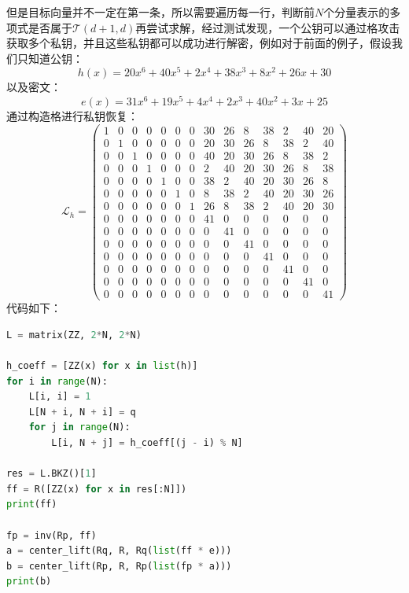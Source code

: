 \documentclass{book}
\numberwithin{equation}{subsubsection}
\begin{document}
但是目标向量并不一定在第一条，所以需要遍历每一行，判断前$N$个分量表示的多项式是否属于$\mathcal{T}(d+1, d)$再尝试求解，经过测试发现，一个公钥可以通过格攻击获取多个私钥，并且这些私钥都可以成功进行解密，例如对于前面的例子，假设我们只知道公钥：
\begin{equation}
    h(x)=20 x^{6} + 40 x^{5} + 2 x^{4} + 38 x^{3} + 8 x^{2} + 26 x + 30
    \nonumber
\end{equation}
以及密文：
\begin{equation}
    e(x)=31 x^{6} + 19 x^{5} + 4 x^{4} + 2 x^{3} + 40 x^{2} + 3 x + 25
    \nonumber
\end{equation}
通过构造格进行私钥恢复：
\begin{equation}
    \mathcal{L}_h=\left(\begin{array}{rrrrrrrrrrrrrr} 1 & 0 & 0 & 0 & 0 & 0 & 0 & 30 & 26 & 8 & 38 & 2 & 40 & 20 \\ 0 & 1 & 0 & 0 & 0 & 0 & 0 & 20 & 30 & 26 & 8 & 38 & 2 & 40 \\ 0 & 0 & 1 & 0 & 0 & 0 & 0 & 40 & 20 & 30 & 26 & 8 & 38 & 2 \\ 0 & 0 & 0 & 1 & 0 & 0 & 0 & 2 & 40 & 20 & 30 & 26 & 8 & 38 \\ 0 & 0 & 0 & 0 & 1 & 0 & 0 & 38 & 2 & 40 & 20 & 30 & 26 & 8 \\ 0 & 0 & 0 & 0 & 0 & 1 & 0 & 8 & 38 & 2 & 40 & 20 & 30 & 26 \\ 0 & 0 & 0 & 0 & 0 & 0 & 1 & 26 & 8 & 38 & 2 & 40 & 20 & 30 \\ 0 & 0 & 0 & 0 & 0 & 0 & 0 & 41 & 0 & 0 & 0 & 0 & 0 & 0 \\ 0 & 0 & 0 & 0 & 0 & 0 & 0 & 0 & 41 & 0 & 0 & 0 & 0 & 0 \\ 0 & 0 & 0 & 0 & 0 & 0 & 0 & 0 & 0 & 41 & 0 & 0 & 0 & 0 \\ 0 & 0 & 0 & 0 & 0 & 0 & 0 & 0 & 0 & 0 & 41 & 0 & 0 & 0 \\ 0 & 0 & 0 & 0 & 0 & 0 & 0 & 0 & 0 & 0 & 0 & 41 & 0 & 0 \\ 0 & 0 & 0 & 0 & 0 & 0 & 0 & 0 & 0 & 0 & 0 & 0 & 41 & 0 \\ 0 & 0 & 0 & 0 & 0 & 0 & 0 & 0 & 0 & 0 & 0 & 0 & 0 & 41 \end{array}\right)
    \nonumber
\end{equation}
代码如下：
\begin{lstlisting}[language=Python,basicstyle=\ttfamily,breaklines=true,keywordstyle=\bfseries\color{blue}]
L = matrix(ZZ, 2*N, 2*N)

h_coeff = [ZZ(x) for x in list(h)]
for i in range(N):
    L[i, i] = 1
    L[N + i, N + i] = q
    for j in range(N):
        L[i, N + j] = h_coeff[(j - i) % N]

res = L.BKZ()[1]
ff = R([ZZ(x) for x in res[:N]])
print(ff)

fp = inv(Rp, ff)
a = center_lift(Rq, R, Rq(list(ff * e)))
b = center_lift(Rp, R, Rp(list(fp * a)))
print(b)
\end{lstlisting}
\end{document}
